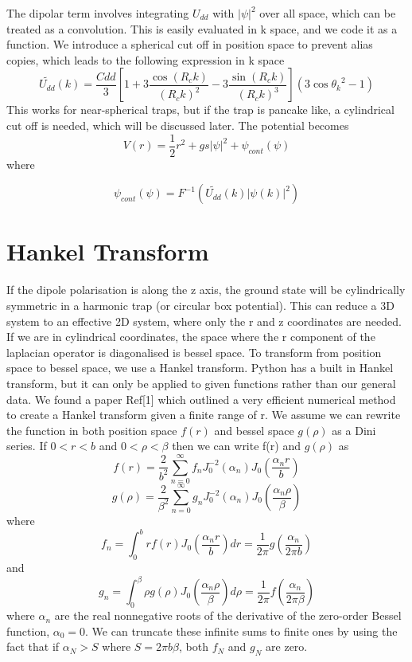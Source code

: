 \documentclass[12pt]{article}
\begin{document}
The dipolar term involves integrating $U_{dd}$ with $|\psi|^{2}$ over all space, which can be treated as a convolution. This is easily evaluated in k space, and we code it as a function. We introduce a spherical cut off in position space to prevent alias copies, which leads to the following expression in k space 
\begin{equation}
\tilde{U_{dd}}(k) = \frac{Cdd}{3}[1+3\frac{\cos(R_{c}k)}{(R_{c}k)^{2}}-3\frac{\sin(R_{c}k)}{(R_{c}k)^{3}}](3\cos{\theta_k}^{2}-1)
\end{equation} 
This works for near-spherical traps, but if the trap is pancake like, a cylindrical cut off is needed, which will be discussed later.
The potential becomes
\begin{equation}
V(r) = \frac{1}{2}r^{2}+gs|\psi|^{2}+\psi_{cont}(\psi)
\end{equation}
where 

\begin{equation}
\psi_{cont}(\psi) = F^{-1}(\tilde{U_{dd}}(k)|\psi(k)|^{2})
\end{equation}
\section{Hankel Transform}
If the dipole polarisation is along the z axis, the ground state will be cylindrically symmetric in a harmonic trap (or circular box potential). This can reduce a 3D system to an effective 2D system, where only the r and z coordinates are needed. If we are in cylindrical coordinates, the space where the r component of the laplacian operator is diagonalised is bessel space. To transform from position space to bessel space, we use a Hankel transform. Python has a built in Hankel transform, but it can only be applied to given functions rather than our general data. We found a paper Ref[1] which outlined a very efficient numerical method to create a Hankel transform given a finite range of r. We assume we can rewrite the function in both position space $f(r)$ and bessel space $g(\rho)$ as a Dini series. If $0<r<b$ and $0<\rho<\beta$ then we can write f(r) and $g(\rho)$ as
\begin{equation}
f(r) = \frac{2}{b^{2}}\sum_{n=0}^{\infty}f_{n}J_{0}^{-2}(\alpha_{n})J_{0}(\frac{\alpha_{n}r}{b})
\end{equation}
\begin{equation}
g(\rho) = \frac{2}{\beta^{2}}\sum_{n=0}^{\infty}g_{n}J_{0}^{-2}(\alpha_{n})J_{0}(\frac{\alpha_{n}\rho}{\beta})
\end{equation}
where 
\begin{equation}
f_{n} = \int_{0}^{b}rf(r)J_{0}(\frac{\alpha_{n}r}{b})dr=\frac{1}{2\pi}g(\frac{\alpha_{n}}{2\pi b})
\end{equation}
and
\begin{equation}
g_{n} = \int_{0}^{\beta}\rho g(\rho)J_{0}(\frac{\alpha_{n}\rho}{\beta})d\rho=\frac{1}{2\pi}f(\frac{\alpha_{n}}{2\pi\beta})
\end{equation}
where $\alpha_{n}$ are the real nonnegative roots of the derivative of the zero-order Bessel function, $\alpha_{0}=0$. We can truncate these infinite sums to finite ones by using the fact that if $\alpha_{N} >S$ where $S=2\pi b\beta$, both $f_{N}$ and $g_{N}$ are zero.
\end{document}
